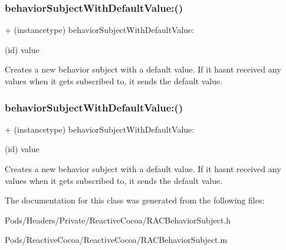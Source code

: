 \subsubsection{\texorpdfstring{behavior\+Subject\+With\+Default\+Value\+:()}{behaviorSubjectWithDefaultValue:()}\hspace{0.1cm}{\footnotesize\ttfamily [2/3]}}
{\footnotesize\ttfamily + (instancetype) behavior\+Subject\+With\+Default\+Value\+: \begin{DoxyParamCaption}\item[{(id)}]{value }\end{DoxyParamCaption}}

Creates a new behavior subject with a default value. If it hasn\textquotesingle{}t received any values when it gets subscribed to, it sends the default value. \mbox{\label{interface_r_a_c_behavior_subject_aa13b741ed2607310913d29d9862e6ea3}} 
\subsubsection{\texorpdfstring{behavior\+Subject\+With\+Default\+Value\+:()}{behaviorSubjectWithDefaultValue:()}\hspace{0.1cm}{\footnotesize\ttfamily [3/3]}}
{\footnotesize\ttfamily + (instancetype) behavior\+Subject\+With\+Default\+Value\+: \begin{DoxyParamCaption}\item[{(id)}]{value }\end{DoxyParamCaption}}

Creates a new behavior subject with a default value. If it hasn\textquotesingle{}t received any values when it gets subscribed to, it sends the default value. 

The documentation for this class was generated from the following files\+:\begin{DoxyCompactItemize}
\item 
Pods/\+Headers/\+Private/\+Reactive\+Cocoa/R\+A\+C\+Behavior\+Subject.\+h\item 
Pods/\+Reactive\+Cocoa/\+Reactive\+Cocoa/R\+A\+C\+Behavior\+Subject.\+m\end{DoxyCompactItemize}
